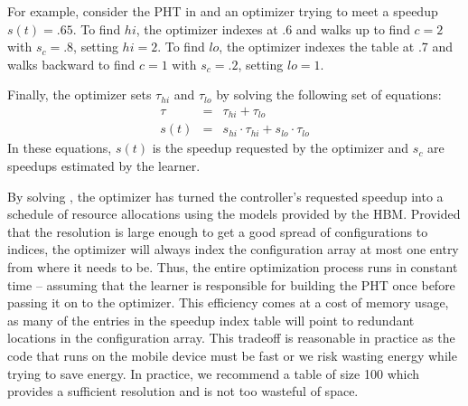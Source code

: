 For example, consider the PHT in  and an optimizer trying
to meet a speedup $s(t) = .65$.  To find $hi$, the optimizer indexes
at .6 and walks up to find $c=2$ with $s_c=.8$, setting $hi = 2$.  To
find $lo$, the optimizer indexes the table at .7 and walks backward to
find $c=1$ with $s_c=.2$, setting $lo = 1$.

Finally, the optimizer sets $\tau_{hi}$ and $\tau_{lo}$ by solving the
following set of equations:
\begin{eqnarray}
  \tau &=& \tau_{hi} + \tau_{lo}    \label{eqn:s1} \\
  s(t) &=& s_{hi} \cdot \tau_{hi} + s_{lo} \cdot \tau_{lo} \label{eqn:s2} 
\end{eqnarray}
In these equations, $s(t)$ is the speedup requested by the optimizer
and $s_c$ are speedups estimated by the learner.

By solving , the optimizer has turned the controller's
requested speedup into a schedule of resource allocations using the
models provided by the HBM.  Provided that the resolution is large
enough to get a good spread of configurations to indices, the
optimizer will always index the configuration array at most one entry
from where it needs to be.  Thus, the entire optimization process runs
in constant time -- assuming that the learner is responsible for
building the PHT once before passing it on to the optimizer.  This
efficiency comes at a cost of memory usage, as many of the entries in
the speedup index table will point to redundant locations in the
configuration array.  This tradeoff is reasonable in practice as the
code that runs on the mobile device must be fast or we risk wasting
energy while trying to save energy.  In practice, we recommend a table
of size 100 which provides a sufficient resolution and is not too
wasteful of space.






